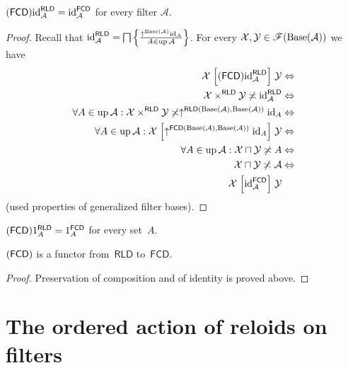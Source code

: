 \begin{prop}\label{fcd-id}
$(\mathsf{FCD}){\operatorname{id}}_{\mathcal{A}}^{\mathsf{RLD}}={\operatorname{id}}_{\mathcal{A}}^{\mathsf{FCD}}$
for every filter $\mathcal{A}$.\end{prop}
\begin{proof}
Recall that ${\operatorname{id}}_{\mathcal{A}}^{\mathsf{RLD}}=\bigsqcap\left\{ \frac{\uparrow^{\operatorname{Base}(\mathcal{A})}{\operatorname{id}}_{A}}{A\in\operatorname{up}\mathcal{A}}\right\}$.
For every $\mathcal{X},\mathcal{Y}\in\mathscr{F}(\operatorname{Base}(\mathcal{A}))$ we
have
\begin{align*}
\mathcal{X}\mathrel{\left[(\mathsf{FCD}){\operatorname{id}}_{\mathcal{A}}^{\mathsf{RLD}}\right]}\mathcal{Y} & \Leftrightarrow\\
\mathcal{X}\times^{\mathsf{RLD}}\mathcal{Y}\not\asymp{\operatorname{id}}_{\mathcal{A}}^{\mathsf{RLD}} & \Leftrightarrow\\
\forall A\in\operatorname{up}\mathcal{A}:\mathcal{X}\times^{\mathsf{RLD}}\mathcal{Y}\not\asymp\uparrow^{\mathsf{RLD}(\operatorname{Base}(\mathcal{A}),\operatorname{Base}(\mathcal{A}))}{\operatorname{id}}_{A} & \Leftrightarrow\\
\forall A\in\operatorname{up}\mathcal{A}:\mathcal{X}\mathrel{\left[\uparrow^{\mathsf{FCD}(\operatorname{Base}(\mathcal{A}),\operatorname{Base}(\mathcal{A}))}{\operatorname{id}}_{A}\right]}\mathcal{Y} & \Leftrightarrow\\
\forall A\in\operatorname{up}\mathcal{A}:\mathcal{X}\sqcap\mathcal{Y}\not\asymp A & \Leftrightarrow\\
\mathcal{X}\sqcap\mathcal{Y}\not\asymp\mathcal{A} & \Leftrightarrow\\
\mathcal{X}\mathrel{\left[{\operatorname{id}}_{\mathcal{A}}^{\mathsf{FCD}}\right]}\mathcal{Y}
\end{align*}
(used properties of generalized filter bases).\end{proof}
\begin{cor}
$(\mathsf{FCD})1_{A}^{\mathsf{RLD}}=1_{A}^{\mathsf{FCD}}$ for every set~$A$.\end{cor}
\begin{prop}
$(\mathsf{FCD})$ is a functor from~$\mathsf{RLD}$ to~$\mathsf{FCD}$.\end{prop}
\begin{proof}
Preservation of composition and of identity is proved above.
\end{proof}

\section{The ordered action of reloids on filters}
\label{sec-reloid-action}

